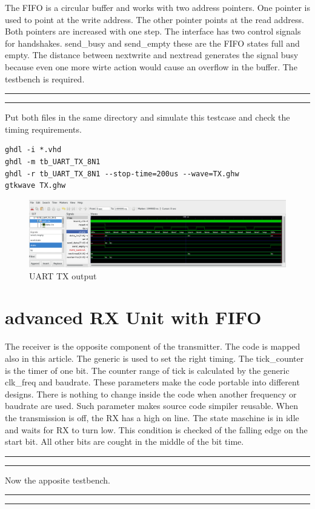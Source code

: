 \documentclass[a4paper,11pt]{article}
\begin{document}
 The FIFO is a circular buffer and works with two address pointers. One pointer is used to point at the write address. The other pointer points at the read address. Both pointers are increased with one step. The interface has two control signals for handshakes. send\_busy and send\_empty these are the FIFO states full and empty. The distance between nextwrite and nextread generates the signal busy because even one more wirte action would cause an overflow in the buffer.
 The testbench is required.
\\
\hrule

\hrule
\vspace{10pt}
Put both files in the same directory and simulate this testcase and check the timing requirements.

\begin{verbatim}
ghdl -i *.vhd
ghdl -m tb_UART_TX_8N1
ghdl -r tb_UART_TX_8N1 --stop-time=200us --wave=TX.ghw
gtkwave TX.ghw
\end{verbatim}

\begin{figure}[H]
  \begin{center}
    \includegraphics[scale=0.3]{tx/TX_simple.png}
    \caption{UART TX output}
  \end{center}
\end{figure}

\section{advanced RX Unit with FIFO}
The receiver is the opposite component of the transmitter. The code is mapped also in this article. The generic is used to set the right timing. The tick\_counter is the timer of one bit. The counter range of tick is calculated by the generic clk\_freq and baudrate. These parameters make the code portable into different designs. There is nothing to change inside the code when another frequency or baudrate are used. Such parameter makes source code simpiler reusable. When the transmission is off, the RX has a high on line. The state maschine is in idle and waits for RX to turn low. This condition is checked of the falling edge on the start bit. All other bits are cought in the middle of the bit time. 
\\
\hrule

\hrule
\vspace{10pt}
Now the apposite testbench.
\hrule

\hrule
\vspace{10pt}
\end{document}
